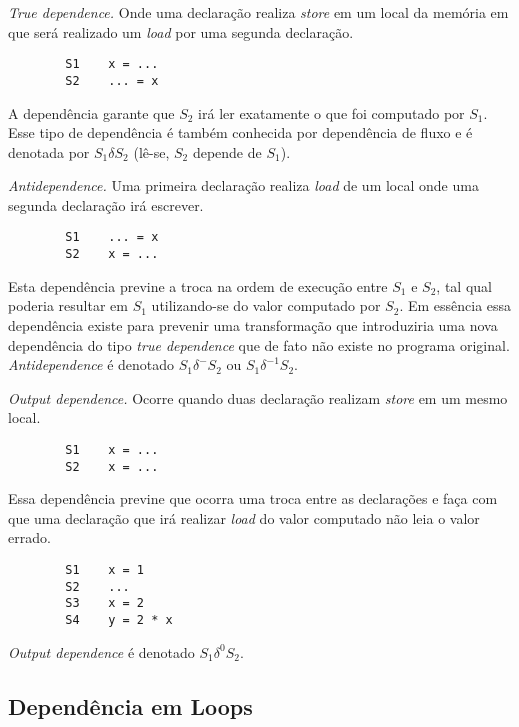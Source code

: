 \begin{alineas}
        \item \textit{True dependence.} Onde uma declaração realiza 
        \textit{store} em um local da memória em que será realizado um 
        \textit{load} por uma segunda declaração.
        \begin{verbatim}
        S1    x = ...
        S2    ... = x
        \end{verbatim}
        A dependência garante que $S_2$ irá ler exatamente o que foi computado
        por $S_1$. Esse tipo de dependência é também conhecida por dependência 
        de fluxo e é denotada por $S_1 \delta S_2$ (lê-se, $S_2$ depende 
        de $S_1$).
        \item \textit{Antidependence.} Uma primeira declaração realiza
        \textit{load} de um local onde uma segunda declaração irá escrever.
        \begin{verbatim}
        S1    ... = x
        S2    x = ...
        \end{verbatim}
        Esta dependência previne a troca na ordem de execução entre $S_1$ 
        e $S_2$, tal qual poderia resultar em $S_1$ utilizando-se do valor 
        computado por $S_2$. 
        Em essência essa dependência existe para prevenir uma transformação que 
        introduziria uma nova dependência do tipo \textit{true dependence} que 
        de fato não existe no programa original. 
        \textit{Antidependence} é denotado $S_1 \delta^- S_2$ 
        ou $S_1 \delta^{-1} S_2$.

        \item \textit{Output dependence.} Ocorre quando duas declaração 
        realizam \textit{store} em um mesmo local.
        \begin{verbatim}
        S1    x = ...
        S2    x = ...
        \end{verbatim}
        Essa dependência previne que ocorra uma troca entre as declarações e 
        faça com que uma declaração que irá realizar \textit{load} do valor 
        computado não leia o valor errado.
        \begin{verbatim}
        S1    x = 1
        S2    ...
        S3    x = 2 
        S4    y = 2 * x
        \end{verbatim}
        \textit{Output dependence} é denotado $S_1 \delta^0 S_2$.
\end{alineas}

\subsection{Dependência em Loops}

